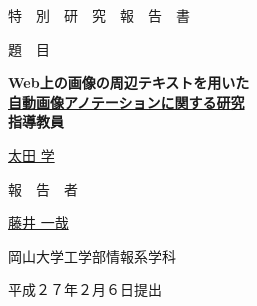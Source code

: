 \begin{center}
 \vspace{80pt}
 
 \large{特　別　研　究　報　告　書}

 \vspace{60pt}
 \large{題　目}
 \vspace{60pt}
 
 \bf\LARGE\hspace{5pt}Web上の画像の周辺テキストを用いた\hspace{5pt}\\
 \underline{\bf \LARGE\hspace{5pt} 自動画像アノテーションに関する研究 \hspace{5pt}} \\
 \vspace{7pt}
 \vspace{100pt}
 \large{指導教員}
 \vspace{15pt}

\underline{\LARGE\hspace{5pt} 太田 \hspace{10pt} 学 \hspace{5pt}}

 \vspace{50pt}
 \large{報　告　者}
 \vspace{10pt}

\underline{\LARGE \hspace{5pt} 藤井 \hspace{10pt} 一哉 \hspace{5pt}}

 \vspace{110pt}
 岡山大学工学部情報系学科

 \vspace{20pt}
 平成２７年２月６日提出
\end{center}